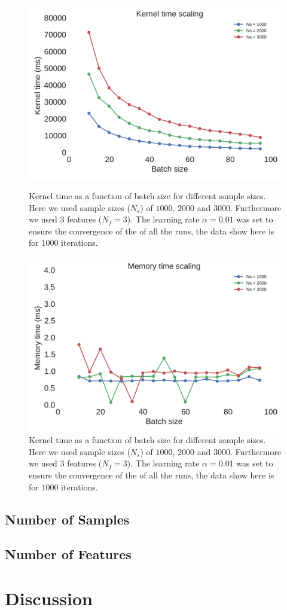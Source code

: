 \documentclass[11pt,a4paper]{article}
\begin{document}
\begin{figure}[H]
	\centering
  \includegraphics[width=\linewidth]{batch_size_scaling_kernel.pdf}
  \caption{Kernel time as a function of batch size for different sample sizes. Here we used sample sizes ($N_s$) of $1000$, $2000$ and $3000$. Furthermore we used $3$ features ($N_f=3$). The learning rate $\alpha=0.01$ was set to ensure the convergence of the of all the runs, the data show here is for $1000$ iterations.}
  \label{fig:batch_size_scaling_kernel}
\endminipage
\hfill
{}
  \includegraphics[width=\linewidth]{batch_size_scaling_memory.pdf}
  \caption{Kernel time as a function of batch size for different sample sizes. Here we used sample sizes ($N_s$) of $1000$, $2000$ and $3000$. Furthermore we used $3$ features ($N_f=3$). The learning rate $\alpha=0.01$ was set to ensure the convergence of the of all the runs, the data show here is for $1000$ iterations.}
  \label{fig:batch_size_scaling_memory}
\endminipage
\end{figure}

\subsection{Number of Samples}


\subsection{Number of Features}


\section{Discussion}



\end{document}
